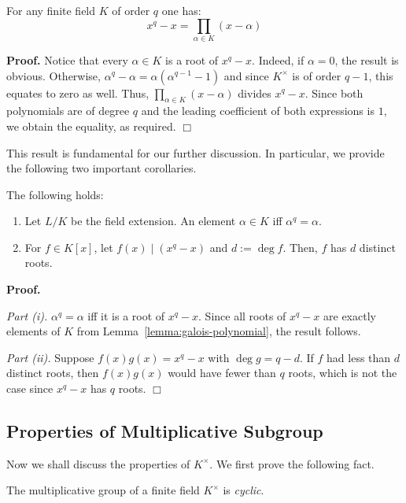 \documentclass{template}
\newcommand{\qedwhite}{\hfill \ensuremath{\Box}}
\begin{document}
\begin{lemma}\label{lemma:galois-polynomial}
    For any finite field $K$ of order $q$ one has:
    \[x^q-x = \prod_{\alpha \in K}(x-\alpha)\]
\end{lemma}

\textbf{Proof.} Notice that every $\alpha \in K$ is a root of $x^q-x$. Indeed,
if $\alpha=0$, the result is obvious. Otherwise,
$\alpha^q-\alpha=\alpha(\alpha^{q-1}-1)$ and since $K^{\times}$ is of order
$q-1$, this equates to zero as well. Thus, $\prod_{\alpha \in K}(x-\alpha)$
divides $x^q-x$. Since both polynomials are of degree $q$ and the leading 
coefficient of both expressions is $1$, we obtain the equality, as required. \qedwhite

This result is fundamental for our further discussion. In particular, we provide
the following two important corollaries.

\begin{proposition}\label{proposition:galois-polynomial-corollary}
    The following holds:
    \begin{enumerate}
        \item[\textit{(i)}] Let $L/K$ be the field extension. An element $\alpha \in K$ iff
    $\alpha^q=\alpha$.
        \item[\textit{(ii)}] For $f \in K[x]$, let $f(x) \mid (x^q-x)$ and $d := \deg
        f$. Then, $f$ has $d$ distinct roots.
    \end{enumerate}
\end{proposition}

\textbf{Proof.} 

\textit{Part (i).} $\alpha^q=\alpha$ iff it is a root of $x^q-x$. Since all
roots of $x^q-x$ are exactly elements of $K$ from
Lemma~\ref{lemma:galois-polynomial}, the result follows.

\textit{Part (ii).} Suppose $f(x)g(x) = x^q-x$ with $\deg g = q-d$. If 
$f$ had less than $d$ distinct roots, then $f(x)g(x)$ would have fewer 
than $q$ roots, which is not the case since $x^q-x$ has $q$ roots. \qedwhite

\subsection{Properties of Multiplicative Subgroup}

Now we shall discuss the properties of $K^{\times}$. We first prove the 
following fact.
\begin{theorem}\label{theorem:fp-cyclic}
    The multiplicative group of a finite field $K^{\times}$ is \textit{cyclic}.
\end{theorem}
\end{document}
